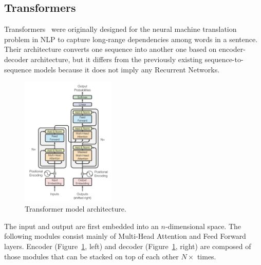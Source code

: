 \subsection{Transformers}
Transformers~\cite{vaswani2017attention} were originally designed for the neural machine translation
problem in NLP to capture long-range dependencies among words in a sentence.
Their architecture converts one sequence into another one based on encoder-decoder architecture,
but it differs from the previously existing sequence-to-sequence models because
it does not imply any Recurrent Networks. 
\begin{figure}
  \centering
  \includegraphics[width=0.4\textwidth]{figures/03_transformer_overview.png}
  \caption{Transformer model architecture. \cite{vaswani2017attention}}
  \label{fig:trans_arch}
\end{figure}
The input and output are first embedded into an $n$-dimensional space.
The following modules consist mainly of Multi-Head Attention and Feed Forward layers. 
Encoder (Figure~\ref{fig:trans_arch}, left) and decoder (Figure~\ref{fig:trans_arch}, right)
are composed of those modules that can be stacked on top of each other $N\times$ times.

